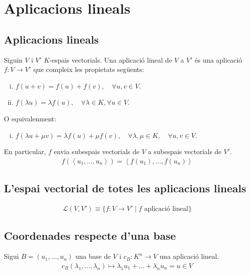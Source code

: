 \section{Aplicacions lineals}
\subsection{Aplicacions lineals}
Siguin $V$ i $V'$ $K$-espais vectorials. Una aplicació lineal de $V$ a $V'$ és una aplicació $f: V \to V'$ que compleix les propietats següents:
\begin{enumerate}[i)]
    \item $f (u + v) = f(u) + f(v) , \quad \forall u ,v \in V$.
    \item $f (\lambda u) = \lambda f(u) , \quad \forall \lambda \in K , \forall u \in V$.
\end{enumerate}
O equivalenment:
\begin{enumerate}[i)]
    \item $f (\lambda u + \mu v) = \lambda f(u) + \mu f(v) , \quad \forall \lambda , \mu \in K , \quad \forall u , v \in V$.
\end{enumerate}
En particular, $f$ envia subespais vectorials de $V$ a subespais vectorials de $V'$.
\begin{align}
    f( \left< u_{1}, \dots , u_{n} \right>) =  \left< f (u_{1}), \dots , f (u_{n}) \right>
\end{align}

\subsection{L'espai vectorial de totes les aplicacions lineals}
\begin{align}
    \mathcal{L}(V , V') \equiv \{ f: V \to V' \mid f \text{ aplicació lineal} \}
\end{align}

\subsection{Coordenades respecte d'una base}
Sigui $B = (u_{1}, \dots , u_{n})$ una base de $V$ i $c_{B}: K^{n} \to V$ una aplicació lineal.
\begin{align}
    c_{B}(\lambda_{1}, \dots , \lambda_{n}) \mapsto \lambda_{1} u_{1} + \dots + \lambda_{n} u_{n} = u \in V
\end{align}


